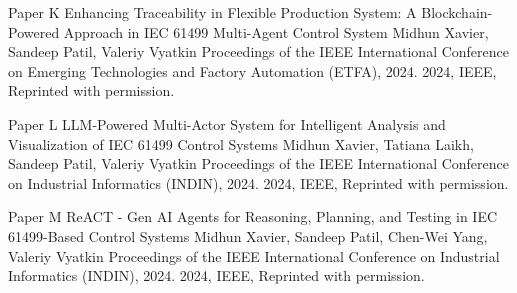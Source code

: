 \documentclass[12pt,a4paper,openright,final,twoside]{cseethesis}
\begin{document}
\def\paperheader{Paper K}
\def\papertitle{Enhancing Traceability in Flexible Production System: A Blockchain-Powered Approach in IEC 61499 Multi-Agent Control System}
\def\paperauthorstring{Midhun Xavier, Sandeep Patil, Valeriy Vyatkin}
\def\referencestring{Proceedings of the IEEE International Conference on Emerging Technologies and Factory Automation (ETFA), 2024.}
\def\copyrightstring{2024, IEEE, Reprinted with permission.}


\makepaperaccepted
  {\paperheader}
  {\papertitle}
  {\paperauthorstring}
  {\referencestring}
  {\copyrightstring}



\def\paperheader{Paper L}
\def\papertitle{LLM-Powered Multi-Actor System for Intelligent Analysis and Visualization of IEC 61499 Control Systems}
\def\paperauthorstring{Midhun Xavier, Tatiana Laikh, Sandeep Patil, Valeriy Vyatkin}
\def\referencestring{Proceedings of the IEEE International Conference on Industrial Informatics (INDIN), 2024.}
\def\copyrightstring{2024, IEEE, Reprinted with permission.}


\makepaperaccepted
  {\paperheader}
  {\papertitle}
  {\paperauthorstring}
  {\referencestring}
  {\copyrightstring}



\def\paperheader{Paper M}
\def\papertitle{ReACT - Gen AI Agents for Reasoning, Planning, and Testing in IEC 61499-Based Control Systems}
\def\paperauthorstring{Midhun Xavier, Sandeep Patil, Chen-Wei Yang, Valeriy Vyatkin}
\def\referencestring{Proceedings of the IEEE International Conference on Industrial Informatics (INDIN), 2024.}
\def\copyrightstring{2024, IEEE, Reprinted with permission.}


\makepaperaccepted
  {\paperheader}
  {\papertitle}
  {\paperauthorstring}
  {\referencestring}
  {\copyrightstring}






\printglossary[type=\acronymtype]
\end{document}
